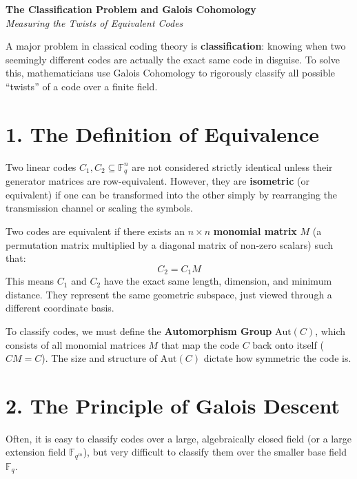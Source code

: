 \documentclass[11pt, a4paper, twoside]{article}
\newcommand{\F}{\mathbb{F}}
\newcommand{\Aut}{\text{Aut}}
\begin{document}
	
	\begin{center}
		{\Large \textbf{The Classification Problem and Galois Cohomology}} \\[0.5em]
		{\normalsize \textit{Measuring the Twists of Equivalent Codes}}
	\end{center}
	\vspace{1em}
	
	A major problem in classical coding theory is \textbf{classification}: knowing when two seemingly different codes are actually the exact same code in disguise. To solve this, mathematicians use Galois Cohomology to rigorously classify all possible ``twists'' of a code over a finite field.
	
	\section*{1. The Definition of Equivalence}
	
	Two linear codes $C_1, C_2 \subseteq \F_q^n$ are not considered strictly identical unless their generator matrices are row-equivalent. However, they are \textbf{isometric} (or equivalent) if one can be transformed into the other simply by rearranging the transmission channel or scaling the symbols.
	
	\begin{conceptbox}
		Two codes are equivalent if there exists an $n \times n$ \textbf{monomial matrix} $M$ (a permutation matrix multiplied by a diagonal matrix of non-zero scalars) such that:
		$$ C_2 = C_1 M $$
		This means $C_1$ and $C_2$ have the exact same length, dimension, and minimum distance. They represent the same geometric subspace, just viewed through a different coordinate basis. 
	\end{conceptbox}
	
	To classify codes, we must define the \textbf{Automorphism Group} $\Aut(C)$, which consists of all monomial matrices $M$ that map the code $C$ back onto itself ($CM = C$). The size and structure of $\Aut(C)$ dictate how symmetric the code is.
	
	\section*{2. The Principle of Galois Descent}
	
	Often, it is easy to classify codes over a large, algebraically closed field (or a large extension field $\F_{q^m}$), but very difficult to classify them over the smaller base field $\F_q$. 
	
\end{document}
